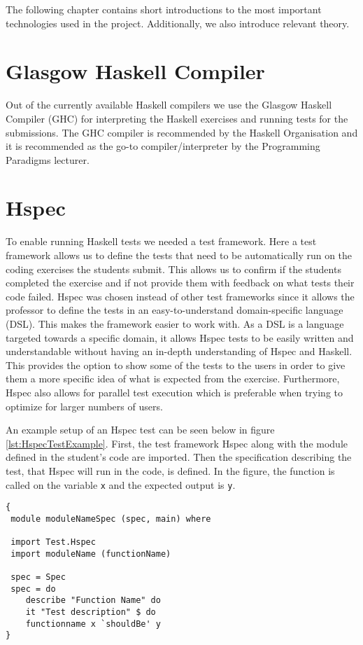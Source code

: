 The following chapter contains short introductions to the most important technologies used in the project. Additionally, we also introduce relevant theory.

\section*{Glasgow Haskell Compiler}
Out of the currently available Haskell compilers we use the Glasgow Haskell Compiler (GHC) for interpreting the Haskell exercises and running tests for the submissions. The GHC compiler is recommended by the Haskell Organisation and it is recommended as the go-to compiler/interpreter by the Programming Paradigms lecturer\cite{Haskell_GHC}.


\section*{Hspec}
To enable running Haskell tests we needed a test framework. Here a test framework allows us to define the tests that need to be automatically run on the coding exercises the students submit. This allows us to confirm if the students completed the exercise and if not provide them with feedback on what tests their code failed.
Hspec was chosen instead of other test frameworks since it allows the professor to define the tests in an easy-to-understand domain-specific language (DSL). 
This makes the framework easier to work with. As a DSL is a language targeted towards a specific domain, it allows Hspec tests to be easily written and understandable without having an in-depth understanding of Hspec and Haskell.
This provides the option to show some of the tests to the users in order to give them a more specific idea of what is expected from the exercise. 
Furthermore, Hspec also allows for parallel test execution which is preferable when trying to optimize for larger numbers of users\cite{Hspec_landing}.

An example setup of an Hspec test can be seen below in figure \ref{lst:HspecTestExample}. First, the test framework Hspec along with the module defined in the student's code are imported. Then the specification describing the test, that Hspec will run in the code, is defined. In the figure, the function is called on the variable \texttt{x} and the expected output is \texttt{y}.

\begin{lstlisting}[language=CSharp, caption={An example of a Hspec Test.}, label={lst:HspecTestExample}]
{
 module moduleNameSpec (spec, main) where

 import Test.Hspec
 import moduleName (functionName)
 
 spec = Spec
 spec = do
 	describe "Function Name" do
 	it "Test description" $ do
	functionname x `shouldBe' y
}
\end{lstlisting}

